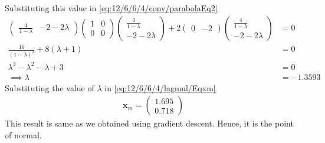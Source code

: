 \documentclass[12pt]{article}
\providecommand{\brak}[1]{\ensuremath{\left(#1\right)}}
\newcommand{\myvec}[1]{\ensuremath{\begin{pmatrix}#1\end{pmatrix}}}
\let\vec\mathbf
\begin{document}
Substituting this value in 
	\eqref{eq:12/6/6/4/conv/parabolaEq2}
\begin{align}
	\myvec{\frac{4}{1-\lambda}&-2-2\lambda}\myvec{1&0\\0&0}\myvec{\frac{4}{1-\lambda}\\-2-2\lambda}+2\myvec{0&-2}\myvec{\frac{4}{1-\lambda}\\-2-2\lambda} &= 0\\
	\frac{16}{\brak{1-\lambda}^2}+8\brak{\lambda+1} &= 0\\
	\lambda^3-\lambda^2-\lambda+3&=0\\
	\implies \lambda &= -1.3593
\end{align}
Substituting the value of $\lambda$ in \eqref{eq:12/6/6/4/lagmul/Eqxm}
\begin{align}
	\vec{x}_{m} = \myvec{1.695\\0.718}
\end{align}
This result is same as we obtained using gradient descent. Hence, it is the point of normal.
\end{document}
